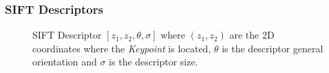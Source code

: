 \documentclass[aspectratio=169]{beamer}
\begin{document}
    
    \begin{frame}
        \frametitle{SIFT Descriptors}
        \begin{center}
   			\begin{figure}[thpb]
      			\centering
      			\setlength\fboxsep{0pt}
	  			\setlength\fboxrule{0.5pt}
      			\caption{\centering SIFT Descriptor $ [ z_1, z_2, \theta, \sigma ] $ where $ (z_1, z_2) $ are the 2D coordinates where the \textit{Keypoint} is located, $ \theta $ is the descriptor general orientation and $ \sigma $ is the descriptor size. }
      			\label{figure1}
   			\end{figure}        
        \end{center}
    \end{frame}   
    
\end{document}
